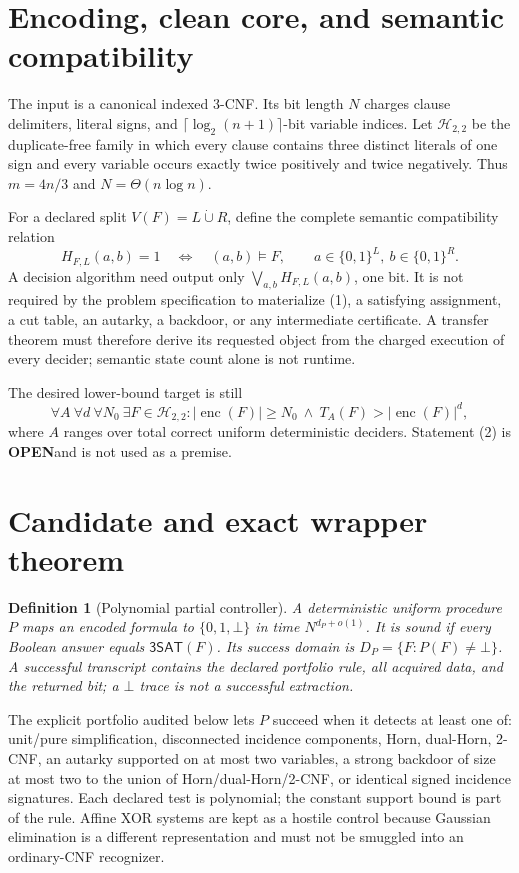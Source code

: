 \documentclass[11pt]{article}
\newtheorem{definition}{Definition}
\newcommand{\SAT}{\mathsf{3SAT}}
\newcommand{\Htwo}{\mathcal H_{2,2}}
\newcommand{\OPEN}{\textbf{OPEN}}
\begin{document}
\section{Encoding, clean core, and semantic compatibility}

The input is a canonical indexed 3-CNF.  Its bit length $N$ charges clause
delimiters, literal signs, and $\lceil\log_2(n+1)\rceil$-bit variable indices.
Let $\Htwo$ be the duplicate-free family in which every clause contains three
distinct literals of one sign and every variable occurs exactly twice
positively and twice negatively.  Thus $m=4n/3$ and
$N=\Theta(n\log n)$.

For a declared split $V(F)=L\mathbin{\dot\cup}R$, define the complete semantic
compatibility relation
\[
 H_{F,L}(a,b)=1 \quad\Longleftrightarrow\quad (a,b)\models F,
 \qquad a\in\{0,1\}^{L},\ b\in\{0,1\}^{R}.                 \tag{1}
\]
A decision algorithm need output only
$\bigvee_{a,b}H_{F,L}(a,b)$, one bit.  It is not required by the problem
specification to materialize (1), a satisfying assignment, a cut table, an
autarky, a backdoor, or any intermediate certificate.  A transfer theorem
must therefore derive its requested object from the charged execution of
every decider; semantic state count alone is not runtime.

The desired lower-bound target is still
\[
 \forall A\ \forall d\ \forall N_0\ \exists F\in\Htwo:
 |\operatorname{enc}(F)|\ge N_0\ \land\
 T_A(F)>|\operatorname{enc}(F)|^d,                          \tag{2}
\]
where $A$ ranges over total correct uniform deterministic deciders.  Statement
(2) is \OPEN and is not used as a premise.

\section{Candidate and exact wrapper theorem}

\begin{definition}[Polynomial partial controller]
A deterministic uniform procedure $P$ maps an encoded formula to
$\{0,1,\bot\}$ in time $N^{d_P+o(1)}$.  It is sound if every Boolean answer
equals $\SAT(F)$.  Its success domain is
$D_P=\{F:P(F)\ne\bot\}$.  A successful transcript contains the declared
portfolio rule, all acquired data, and the returned bit; a $\bot$ trace is not
a successful extraction.
\end{definition}

The explicit portfolio audited below lets $P$ succeed when it detects at
least one of: unit/pure simplification, disconnected incidence components,
Horn, dual-Horn, 2-CNF, an autarky supported on at most two variables, a
strong backdoor of size at most two to the union of Horn/dual-Horn/2-CNF, or
identical signed incidence signatures.  Each declared test is polynomial;
the constant support bound is part of the rule.  Affine XOR systems are kept
as a hostile control because Gaussian elimination is a different
representation and must not be smuggled into an ordinary-CNF recognizer.
\end{document}
